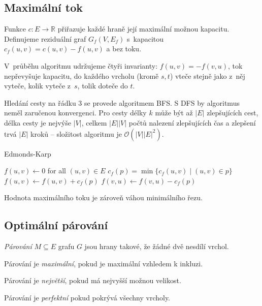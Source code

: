 \subsection{Maximální tok}

Funkce $c : E \to \mathbb{R}$ přiřazuje každé hraně její maximální
možnou kapacitu. Definujeme reziduální graf
$G_{f}(V,E_{f})$ s~kapacitou $c_{f}(u,v)=c(u,v)-f(u,v)$ a bez toku.

V~průběhu algoritmu udržujeme čtyři invarianty:
$f(u,v) = -f(v,u)$, tok nepřevyšuje kapacitu,
do každého vrcholu (kromě $s,t$) vteče stejně jako z~něj vyteče,
kolik vyteče z~$s$, tolik doteče do $t$.

Hledání cesty na řádku 3 se provede algoritmem BFS. S DFS by algoritmus
neměl zaručenou konvergenci. Pro cesty délky $k$
může být až $\lvert E \rvert$ zlepšujících cest, délka cesty je nejvýše
$\lvert V \rvert$, celkem $\lvert E \rvert \lvert V \rvert$
počtů nalezení zlepšujících čas a zlepšení trvá $\lvert E \rvert$
kroků -- složitost algoritmu je
$\mathcal{O}(\lvert V \rvert \lvert E \rvert ^2)$.

\begin{algorithm}[H]
\caption{Edmonds-Karp}
\begin{algorithmic}[1]
    \State $f(u,v) \gets 0$ for all $(u,v) \in E$
        \State $c_f(p) = \min \{ c_f(u,v) \mid (u,v) \in p \}$
            \State $f(u,v) \gets f(u,v) + c_f(p)$
            \State $f(v,u) \gets f(v,u) - c_f(p)$
        \EndFor
    \EndWhile
\EndFunction
\end{algorithmic}
\end{algorithm}

\begin{theorem}
Hodnota maximálního toku je zároveň váhou minimálního řezu.
\end{theorem}

\subsection{Optimální párování}


\begin{definition}
    {\em Párování} $M \subseteq E$ grafu $G$ jsou hrany takové, že
    žádné dvě nesdílí vrchol.

    Párování je {\em maximální}, pokud je maximální vzhledem k inkluzi.

    Párování je {\em největší}, pokud má nejvyšší možnou velikost.

    Párování je {\em perfektní} pokud pokrývá všechny vrcholy.
\end{definition}

